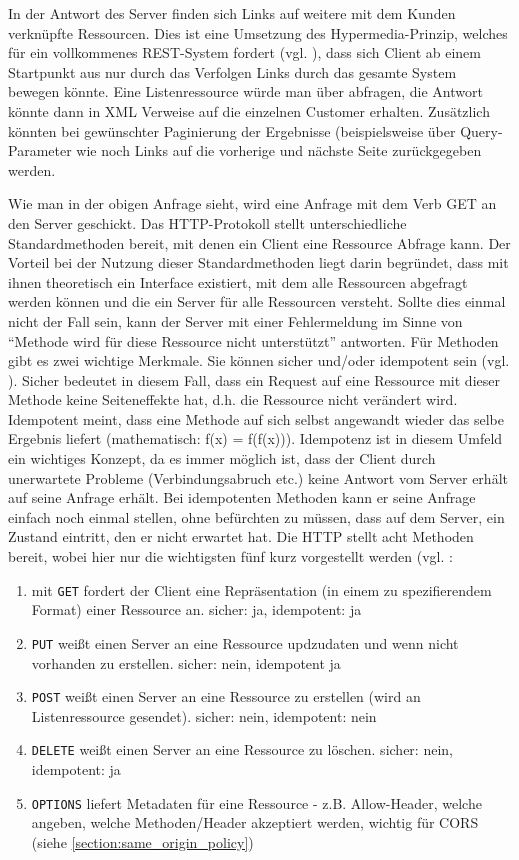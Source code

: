 In der Antwort des Server finden sich Links auf weitere mit dem Kunden verknüpfte Ressourcen. Dies ist eine Umsetzung des Hypermedia-Prinzip, welches für ein vollkommenes REST-System fordert (vgl. \cite{tilkovrestchapter2}), dass sich Client ab einem Startpunkt aus nur durch das Verfolgen Links durch das gesamte System bewegen könnte. Eine Listenressource würde man über  abfragen, die Antwort könnte dann in XML Verweise auf die einzelnen Customer erhalten. Zusätzlich könnten bei gewünschter Paginierung der Ergebnisse (beispielsweise über Query-Parameter wie  noch Links auf die vorherige und nächste Seite zurückgegeben werden.

Wie man in der obigen Anfrage sieht, wird eine Anfrage mit dem Verb GET an den Server geschickt. Das HTTP-Protokoll stellt unterschiedliche Standardmethoden bereit, mit denen ein Client eine Ressource Abfrage kann. Der Vorteil bei der Nutzung dieser Standardmethoden liegt darin begründet, dass mit ihnen theoretisch ein Interface existiert, mit dem alle Ressourcen abgefragt werden können und die ein Server für alle Ressourcen versteht. Sollte dies einmal nicht der Fall sein, kann der Server mit einer Fehlermeldung im Sinne von "`Methode wird für diese Ressource nicht unterstützt"' antworten. Für Methoden gibt es zwei wichtige Merkmale. Sie können sicher und/oder idempotent sein (vgl. \cite{tilkovrestchapter5}). Sicher bedeutet in diesem Fall, dass ein Request auf eine Ressource mit dieser Methode keine Seiteneffekte hat, d.h. die Ressource nicht verändert wird. Idempotent meint, dass eine Methode auf sich selbst angewandt wieder das selbe Ergebnis liefert (mathematisch: f(x) = f(f(x))). Idempotenz ist in diesem Umfeld ein wichtiges Konzept, da es immer möglich ist, dass der Client durch unerwartete Probleme (Verbindungsabruch etc.) keine Antwort vom Server erhält auf seine Anfrage erhält. Bei idempotenten Methoden kann er seine Anfrage einfach noch einmal stellen, ohne befürchten zu müssen, dass auf dem Server, ein Zustand eintritt, den er nicht erwartet hat. Die HTTP stellt acht Methoden bereit, wobei hier nur die wichtigsten fünf kurz vorgestellt werden (vgl. \cite{tilkovrestchapter5}:
\begin{enumerate}
 \item mit \texttt{GET} fordert der Client eine Repräsentation (in einem zu spezifierendem Format) einer Ressource an. sicher: ja, idempotent: ja
 \item \texttt{PUT} weißt einen Server an eine Ressource updzudaten und wenn nicht vorhanden zu erstellen. sicher: nein, idempotent ja 
 \item \texttt{POST} weißt einen Server an eine Ressource zu erstellen (wird an Listenressource gesendet). sicher: nein, idempotent: nein
 \item \texttt{DELETE} weißt einen Server an eine Ressource zu löschen. sicher: nein, idempotent: ja
 \item \texttt{OPTIONS} liefert Metadaten für eine Ressource - z.B. Allow-Header, welche angeben, welche Methoden/Header akzeptiert werden, wichtig für CORS (siehe \ref{section:same_origin_policy})
\end{enumerate}

